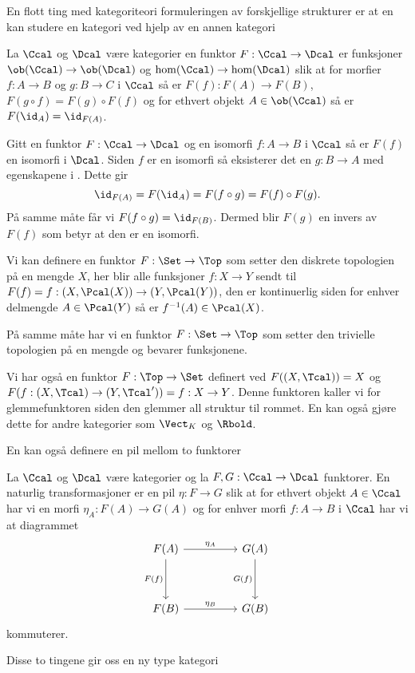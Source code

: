 En flott ting med kategoriteori formuleringen av forskjellige strukturer er at en kan studere en kategori ved hjelp av en annen kategori

\begin{definition}\label{Def:Funktor}
    La $\Ccal$ og $\Dcal$ være kategorier en funktor $F:\Ccal\to\Dcal$ er funksjoner $\ob(\Ccal)\to\ob(\Dcal)$ og $\hom(\Ccal)\to \hom(\Dcal)$ slik at for morfier $f: A\to B$ og $g: B\to C$ i $\Ccal$ så er $F(f): F(A)\to F(B)$, $F(g\circ f) = F(g)\circ F(f)$ og for ethvert objekt $A\in\ob(\Ccal)$ så er $F(\id_A)=\id_{F(A)}$.
\end{definition}

\begin{remark}\label{Rem:FunktorIso}
    Gitt en funktor $F:\Ccal\to\Dcal$ og en isomorfi $f:A\to B$ i $\Ccal$ så er $F(f)$ en isomorfi i $\Dcal$. Siden $f$ er en isomorfi så eksisterer det en $g: B\to A$ med egenskapene i . Dette gir 
    \[\id_{F(A)} = F(\id_A) = F(f\circ g) = F(f)\circ F(g).\]
    På samme måte får vi $F(f\circ g) = \id_{F(B)}$. Dermed blir $F(g)$ en invers av $F(f)$ som betyr at den er en isomorfi.
\end{remark}

\begin{example}\label{Ex:label}
    Vi kan definere en funktor $F:\Set\to\Top$ som setter den diskrete topologien på en mengde $X$, her blir alle funksjoner $f: X\to Y$ sendt til $F(f)=f:(X,\Pcal(X))\to (Y,\Pcal(Y))$, den er kontinuerlig siden for enhver delmengde $A\in \Pcal(Y)$ så er $f^{-1}(A)\in\Pcal(X)$.
\end{example}
På samme måte har vi en funktor $F:\Set\to\Top$ som setter den trivielle topologien på en mengde og bevarer funksjonene.

\begin{example}\label{Ex:Glemmefunktor}
    Vi har også en funktor $F:\Top\to\Set$ definert ved $F((X,\Tcal)) = X$ og $F(f:(X,\Tcal)\to (Y,\Tcal')) = f: X\to Y$. Denne funktoren kaller vi for glemmefunktoren siden den glemmer all struktur til rommet. En kan også gjøre dette for andre kategorier som $\Vect_K$ og $\Rbold$.
\end{example}

En kan også definere en pil mellom to funktorer
\begin{definition}\label{Def:label}
    La $\Ccal$ og $\Dcal$ være kategorier og la $F,G: \Ccal\to\Dcal$ funktorer. En naturlig transformasjoner er en pil $\eta: F\to G$ slik at for ethvert objekt $A\in \Ccal$ har vi en morfi $\eta_A: F(A)\to G(A)$ og for enhver morfi $f: A\to B$ i $\Ccal$ har vi at diagrammet
    \[\begin{tikzcd}
	{F(A)} && {G(A)} \\
	\\
	{F(B)} && {G(B)}
	\arrow["{\eta_A}", from=1-1, to=1-3]
	\arrow["{F(f)}"', from=1-1, to=3-1]
	\arrow["{G(f)}"', from=1-3, to=3-3]
	\arrow["{\eta_B}", from=3-1, to=3-3]
\end{tikzcd}\]
kommuterer.
\end{definition}
Disse to tingene gir oss en ny type kategori

